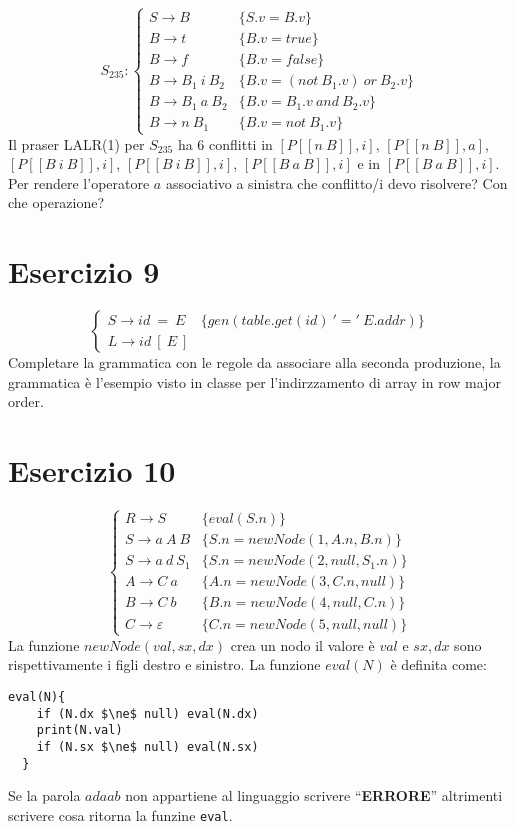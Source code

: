 \documentclass[a4paper]{article}
\begin{document}
\begin{equation*}
  S_{235}:
  \begin{cases}
    S \to B & \{S.v = B.v\}\\
    B \to t & \{B.v = true\}\\
    B \to f & \{B.v = false\}\\
    B \to B_{1}\ i\ B_{2} & \{B.v = (not\ B_{1}.v)\ or\ B_{2}.v\}\\
    B \to B_{1}\ a\ B_{2} & \{B.v = B_{1}.v\ and\ B_{2}.v\}\\
    B \to n\ B_{1} & \{B.v = not\ B_{1}.v\}
  \end{cases}
\end{equation*}
Il praser LALR(1) per $S_{235}$ ha 6 conflitti in $[P[\![n\ B]\!], i]$, $[P[\![n\ B]\!], a]$, $[P[\![B\ i\ B]\!], i]$, $[P[\![B\ i\ B]\!], i]$, $[P[\![B \ a\ B]\!], i]$ e in $[P[\![B\ a\ B]\!], i]$. Per rendere l'operatore $a$ associativo a sinistra che conflitto/i devo risolvere? Con che operazione?

\section*{Esercizio 9}

\begin{equation*}
  \begin{cases}
    S \to id\ =\ E & \{gen(table.get(id)\ '='\ E.addr)\}\\
    L \to id\ [\ E\ ]
  \end{cases}
\end{equation*}
Completare la grammatica con le regole da associare alla seconda produzione, la grammatica è l'esempio visto in classe per l'indirzzamento di array in row major order.

\section*{Esercizio 10}

\begin{equation*}
  \begin{cases}
    R \to S & \{eval(S.n)\}\\
    S \to a\ A\ B & \{S.n = newNode(1, A.n, B.n)\}\\
    S \to a\ d\ S_{1} & \{S.n = newNode(2, null, S_{1}.n)\}\\
    A \to C\ a & \{A.n = newNode(3, C.n, null)\}\\
    B \to C\ b & \{B.n = newNode(4, null, C.n)\}\\
    C \to \varepsilon & \{C.n = newNode(5, null, null)\}
  \end{cases}
\end{equation*}
La funzione $newNode(val,sx, dx)$ crea un nodo il valore è $val$ e $sx, dx$ sono rispettivamente i figli destro e sinistro. La funzione $eval(N)$ è definita come:
\begin{lstlisting}[mathescape=true]
  eval(N){
    if (N.dx $\ne$ null) eval(N.dx)
    print(N.val)
    if (N.sx $\ne$ null) eval(N.sx)
  }
\end{lstlisting}
Se la parola $adaab$ non appartiene al linguaggio scrivere ``\textbf{ERRORE}'' altrimenti scrivere cosa ritorna la funzine \texttt{eval}.
\end{document}
